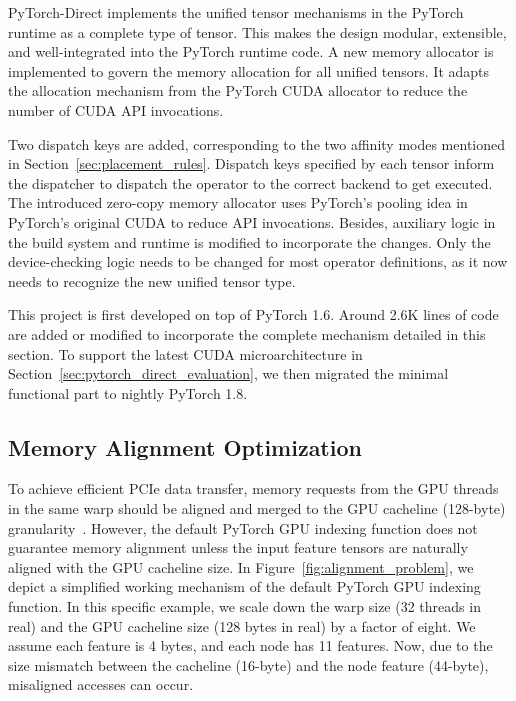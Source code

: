 PyTorch-Direct implements the unified tensor mechanisms in the PyTorch runtime as a complete type of tensor.
This makes the design modular, extensible, and well-integrated into the PyTorch runtime code.
A new memory allocator is implemented to govern the memory allocation for all unified tensors.
It adapts the allocation  mechanism from the PyTorch CUDA allocator to reduce the number of CUDA API invocations.

Two dispatch keys are added, corresponding to the two affinity modes mentioned in Section~\ref{sec:placement_rules}.
Dispatch keys specified by each tensor inform the dispatcher to dispatch the operator to the correct backend to get executed.
The introduced zero-copy memory allocator uses PyTorch's pooling idea in PyTorch's original CUDA to reduce API invocations.
Besides, auxiliary logic in the build system and runtime is modified to incorporate the changes.
Only the device-checking logic needs to be changed for most operator definitions, as it now needs to recognize the new unified tensor type.

This project is first developed on top of PyTorch 1.6.
Around 2.6K lines of code are added or modified to incorporate the complete mechanism detailed in this section.
To support the latest CUDA microarchitecture in Section~\ref{sec:pytorch_direct_evaluation}, we then migrated the minimal functional part to nightly PyTorch 1.8.


\subsection{Memory Alignment Optimization}
\label{sec.PyTorch_direct.implementation.alignment}


To achieve efficient PCIe data transfer, memory requests from the GPU threads in the same warp should be aligned and merged to the GPU cacheline (128-byte) granularity~\cite{minEMOGIEfficientMemoryaccess2020}.
However, the default PyTorch GPU indexing function does not guarantee memory alignment unless the input feature tensors are naturally aligned with the GPU cacheline size.
In Figure~\ref{fig:alignment_problem}, we depict a simplified working mechanism of the default PyTorch GPU indexing function.
In this specific example, we scale down the warp size (32 threads in real) and the GPU cacheline size (128 bytes in real) by a factor of eight.
We assume each feature is 4 bytes, and each node has 11 features.
Now, due to the size mismatch between the cacheline (16-byte) and the node feature (44-byte), misaligned accesses can occur.


